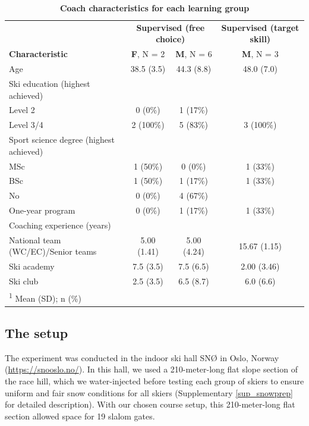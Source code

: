 \documentclass[pdflatex,sn-nature]{sn-jnl}%
\theoremstyle{thmstyleone}%
\theoremstyle{thmstyletwo}%
\theoremstyle{thmstylethree}%
\begin{document}
\begin{table}
\label{tab: descriptive_coach}
\caption{\textbf{Coach characteristics for each learning group}}
\centering
\begin{tabular}[H]{l|c|c|c}
\hline
\multicolumn{1}{c|}{ } & \multicolumn{2}{c|}{\textbf{Supervised (free choice)}} & \multicolumn{1}{c}{\textbf{Supervised (target skill)}} \\
\textbf{Characteristic} & \textbf{F}, N = 2 & \textbf{M}, N = 6 & \textbf{M}, N = 3\\
\hline
Age & 38.5 (3.5) & 44.3 (8.8) & 48.0 (7.0)\\
\hline
Ski education (highest achieved) &  &  & \\
\hline
\hspace{1em}Level 2 & 0 (0\%) & 1 (17\%) & \\
\hline
\hspace{1em}Level 3/4 & 2 (100\%) & 5 (83\%) & 3 (100\%)\\
\hline
Sport science degree (highest achieved) &  &  & \\
\hline
\hspace{1em}MSc & 1 (50\%) & 0 (0\%) & 1 (33\%)\\
\hline
\hspace{1em}BSc & 1 (50\%) & 1 (17\%) & 1 (33\%)\\
\hline
\hspace{1em}No & 0 (0\%) & 4 (67\%) & \\
\hline
\hspace{1em}One-year program & 0 (0\%) & 1 (17\%) & 1 (33\%)\\
\hline
Coaching experience (years) &  &  & \\
\hline
\hspace{1em}National team (WC/EC)/Senior teams & 5.00 (1.41) & 5.00 (4.24) & 15.67 (1.15)\\
\hline
\hspace{1em}Ski academy & 7.5 (3.5) & 7.5 (6.5) & 2.00 (3.46)\\
\hline
\hspace{1em}Ski club & 2.5 (3.5) & 6.5 (8.7) & 6.0 (6.6)\\
\hline
\multicolumn{4}{l}{\rule{0pt}{1em}\textsuperscript{1} Mean (SD); n (\%)}\\
\end{tabular}
\end{table} 


\subsection{The setup}
The experiment was conducted in the indoor ski hall SNØ in Oslo, Norway (\url{https://snooslo.no/}). In this hall, we used a 210-meter-long flat slope section of the race hill, which we water-injected before testing each group of skiers to ensure uniform and fair snow conditions for all skiers (Supplementary \ref{sup_snowprep} for detailed description). With our chosen course setup, this 210-meter-long flat section allowed space for 19 slalom gates. 
\end{document}
